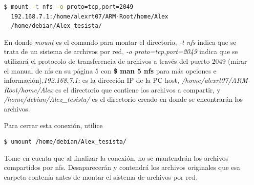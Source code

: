 \begin{lstlisting}[language=bash]
$ mount -t nfs -o proto=tcp,port=2049 
  192.168.7.1:/home/alexrt07/ARM-Root/home/Alex 
  /home/debian/Alex_tesista/
\end{lstlisting}

En donde \textit{mount} es el comando para montar el directorio, \textit{-t nfs} indica que se trata de un sistema de archivos por red, \textit{-o proto=tcp,port=2049} indica que se utilizará el protocolo de transferencia de archivos a través del puerto 2049 (mirar el manual de nfs en su página 5 con \textbf{\$ man 5 nfs} para más opciones e información),\textit{192.168.7.1:} es la dirección IP de la PC host, \textit{/home/alexrt07/ARM-Root/home/Alex} es el directorio que contiene los archivos a compartir, y \textit{/home/debian/Alex\_tesista/} es el directorio creado en donde se encontrarán los archivos.

Para cerrar esta conexión, utilice

\begin{lstlisting}[language=bash]
$ umount /home/debian/Alex_tesista/
\end{lstlisting}

Tome en cuenta que al finalizar la conexión, no se mantendrán los archivos compartidos por nfs. Desaparecerán y contendrá los archivos originales que esa carpeta contenía antes de montar el sistema de archivos por red.

%